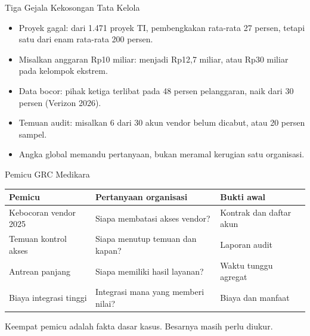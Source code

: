 \documentclass[aspectratio=169, table, 12pt]{beamer}
\begin{document}
\begin{frame}{{\Large Tiga Gejala Kekosongan Tata Kelola}}
  \vspace{4pt}
  \small
  \begin{itemize}
    \item Proyek gagal: dari 1.471 proyek TI, pembengkakan rata-rata 27 persen, tetapi satu dari
          enam rata-rata 200 persen.
    \item Misalkan anggaran Rp10 miliar: menjadi Rp12,7 miliar, atau Rp30 miliar pada kelompok ekstrem.
    \item Data bocor: pihak ketiga terlibat pada 48 persen pelanggaran, naik dari 30 persen
          (Verizon 2026).
    \item Temuan audit: misalkan 6 dari 30 akun vendor belum dicabut, atau 20 persen sampel.
    \item Angka global memandu pertanyaan, bukan meramal kerugian satu organisasi.
  \end{itemize}
\end{frame}

\begin{frame}{{\Large Pemicu GRC Medikara}}
  \vspace{4pt}
  \footnotesize
  \begin{tabularx}{\textwidth}{|>{\raggedright\arraybackslash}p{}|>{\raggedright\arraybackslash}X|>{\raggedright\arraybackslash}X|}
    \hline
    \textbf{Pemicu} & \textbf{Pertanyaan organisasi} & \textbf{Bukti awal} \\ \hline
    Kebocoran vendor 2025 & Siapa membatasi akses vendor? & Kontrak dan daftar akun \\ \hline
    Temuan kontrol akses & Siapa menutup temuan dan kapan? & Laporan audit \\ \hline
    Antrean panjang & Siapa memiliki hasil layanan? & Waktu tunggu agregat \\ \hline
    Biaya integrasi tinggi & Integrasi mana yang memberi nilai? & Biaya dan manfaat \\ \hline
  \end{tabularx}

  \vspace{8pt}
  \small Keempat pemicu adalah fakta dasar kasus. Besarnya masih perlu diukur.
\end{frame}
\end{document}
